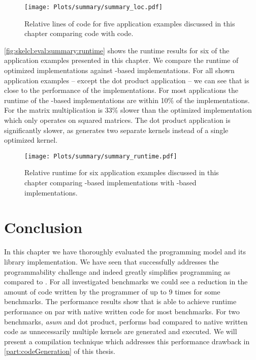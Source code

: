 \begin{figure}[t]
    \centering
    \texttt{[image: Plots/summary/summary\_loc.pdf]}
    \caption{Relative lines of code for five application examples discussed in this chapter comparing \OpenCL code with \SkelCL code.}
    \label{fig:skelcl:eval:summary:loc}
\end{figure}

\autoref{fig:skelcl:eval:summary:runtime} shows the runtime results for six of the application examples presented in this chapter.
We compare the runtime of optimized \OpenCL implementations against \SkelCL-based implementations.
For all shown application examples -- except the dot product application -- we can see that \SkelCL is close to the performance of the \OpenCL implementations.
For most applications the runtime of the \SkelCL-based implementations are within 10\% of the \OpenCL implementations.
For the matrix multiplication \SkelCL is 33\% slower than the optimized \OpenCL implementation which only operates on squared matrices.
The dot product application is significantly slower, as \SkelCL generates two separate \OpenCL kernels instead of a single optimized kernel.

\begin{figure}[t]
    \centering
    \texttt{[image: Plots/summary/summary\_runtime.pdf]}
    \caption{Relative runtime for six application examples discussed in this chapter comparing \OpenCL-based implementations with \SkelCL-based implementations.}
    \label{fig:skelcl:eval:summary:runtime}
\end{figure}

\section{Conclusion}
In this chapter we have thoroughly evaluated the \SkelCL programming model and its \Cpp library implementation.
We have seen that \SkelCL successfully addresses the programmability challenge and indeed greatly simplifies \GPU programming as compared to \OpenCL. 
For all investigated benchmarks we could see a reduction in the amount of code written by the programmer of up to 9 times for some benchmarks.
The performance results show that \SkelCL is able to achieve runtime performance on par with native written \OpenCL code for most benchmarks.
For two benchmarks, \emph{asum} and dot product, \SkelCL performs bad compared to native written code as unnecessarily multiple \OpenCL kernels are generated and executed.
We will present a compilation technique which addresses this performance drawback in \autoref{part:codeGeneration} of this thesis.

